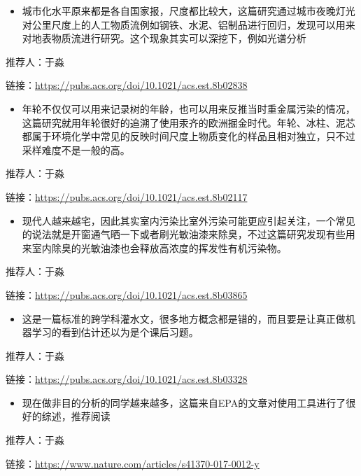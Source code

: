 \documentclass[
]{book}
\providecommand{\tightlist}{%
  \setlength{\itemsep}{0pt}\setlength{\parskip}{0pt}}
\begin{document}
\begin{itemize}
\tightlist
\item
  城市化水平原来都是各自国家报，尺度都比较大，这篇研究通过城市夜晚灯光对公里尺度上的人工物质流例如钢铁、水泥、铝制品进行回归，发现可以用来对地表物质流进行研究。这个现象其实可以深挖下，例如光谱分析
\end{itemize}

推荐人：于淼

链接：\url{https://pubs.acs.org/doi/10.1021/acs.est.8b02838}

\begin{itemize}
\tightlist
\item
  年轮不仅仅可以用来记录树的年龄，也可以用来反推当时重金属污染的情况，这篇研究就用年轮很好的追溯了使用汞齐的欧洲掘金时代。年轮、冰柱、泥芯都属于环境化学中常见的反映时间尺度上物质变化的样品且相对独立，只不过采样难度不是一般的高。
\end{itemize}

推荐人：于淼

链接：\url{https://pubs.acs.org/doi/10.1021/acs.est.8b02117}

\begin{itemize}
\tightlist
\item
  现代人越来越宅，因此其实室内污染比室外污染可能更应引起关注，一个常见的说法就是开窗通气晒一下或者刷光敏油漆来除臭，不过这篇研究发现有些用来室内除臭的光敏油漆也会释放高浓度的挥发性有机污染物。
\end{itemize}

推荐人：于淼

链接：\url{https://pubs.acs.org/doi/10.1021/acs.est.8b03865}

\begin{itemize}
\tightlist
\item
  这是一篇标准的跨学科灌水文，很多地方概念都是错的，而且要是让真正做机器学习的看到估计还以为是个课后习题。
\end{itemize}

推荐人：于淼

链接：\url{https://pubs.acs.org/doi/10.1021/acs.est.8b03328}

\begin{itemize}
\tightlist
\item
  现在做非目的分析的同学越来越多，这篇来自EPA的文章对使用工具进行了很好的综述，推荐阅读
\end{itemize}

推荐人：于淼

链接：\url{https://www.nature.com/articles/s41370-017-0012-y}
\end{document}
